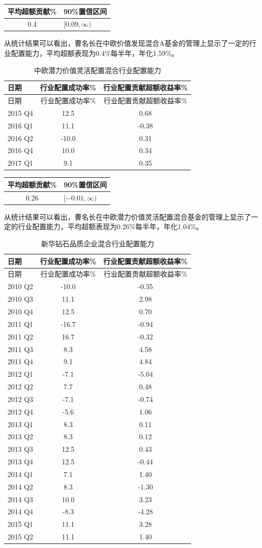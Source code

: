\documentclass[hyperref,]{ctexart}
\begin{document}
\begin{longtable}[]{@{}cl@{}}
\toprule
平均超额贡献\% & 90\%置信区间\tabularnewline
\midrule
\endhead
0.4 & \([0.09,\infty)\)\tabularnewline
\bottomrule
\end{longtable}

从统计结果可以看出，曹名长在中欧价值发现混合A基金的管理上显示了一定的行业配置能力，平均超额表现为0.4\%每半年，年化1.59\%。

\begin{longtable}[]{@{}lcc@{}}
\caption{中欧潜力价值灵活配置混合行业配置能力}\tabularnewline
\toprule
日期 & 行业配置成功率\% & 行业配置贡献超额收益率\%\tabularnewline
\midrule
\endfirsthead
\toprule
日期 & 行业配置成功率\% & 行业配置贡献超额收益率\%\tabularnewline
\midrule
\endhead
2015 Q4 & 12.5 & 0.68\tabularnewline
2016 Q1 & 11.1 & -0.38\tabularnewline
2016 Q2 & -10.0 & 0.31\tabularnewline
2016 Q4 & 10.0 & 0.34\tabularnewline
2017 Q1 & 9.1 & 0.35\tabularnewline
\bottomrule
\end{longtable}

\begin{longtable}[]{@{}cl@{}}
\toprule
平均超额贡献\% & 90\%置信区间\tabularnewline
\midrule
\endhead
0.26 & \([-0.01,\infty)\)\tabularnewline
\bottomrule
\end{longtable}

从统计结果可以看出，曹名长在中欧潜力价值灵活配置混合基金的管理上显示了一定的行业配置能力，平均超额表现为0.26\%每半年，年化1.04\%。

\begin{longtable}[]{@{}lcc@{}}
\caption{新华钻石品质企业混合行业配置能力}\tabularnewline
\toprule
日期 & 行业配置成功率\% & 行业配置贡献超额收益率\%\tabularnewline
\midrule
\endfirsthead
\toprule
日期 & 行业配置成功率\% & 行业配置贡献超额收益率\%\tabularnewline
\midrule
\endhead
2010 Q2 & -10.0 & -0.35\tabularnewline
2010 Q3 & 11.1 & 2.98\tabularnewline
2010 Q4 & 12.5 & 0.70\tabularnewline
2011 Q1 & -16.7 & -0.94\tabularnewline
2011 Q2 & 16.7 & -0.32\tabularnewline
2011 Q3 & 8.3 & 4.58\tabularnewline
2011 Q4 & 9.1 & 4.84\tabularnewline
2012 Q1 & -7.1 & -5.04\tabularnewline
2012 Q2 & 7.7 & 0.48\tabularnewline
2012 Q3 & -7.1 & -0.74\tabularnewline
2012 Q4 & -5.6 & 1.06\tabularnewline
2013 Q1 & 8.3 & 0.11\tabularnewline
2013 Q2 & 8.3 & 0.12\tabularnewline
2013 Q3 & 12.5 & 0.43\tabularnewline
2013 Q4 & 12.5 & -0.44\tabularnewline
2014 Q1 & 7.1 & 1.40\tabularnewline
2014 Q2 & 8.3 & -1.30\tabularnewline
2014 Q3 & 10.0 & 3.23\tabularnewline
2014 Q4 & -8.3 & -4.28\tabularnewline
2015 Q1 & 11.1 & 3.28\tabularnewline
2015 Q2 & 11.1 & 1.40\tabularnewline
\bottomrule
\end{longtable}
\end{document}
